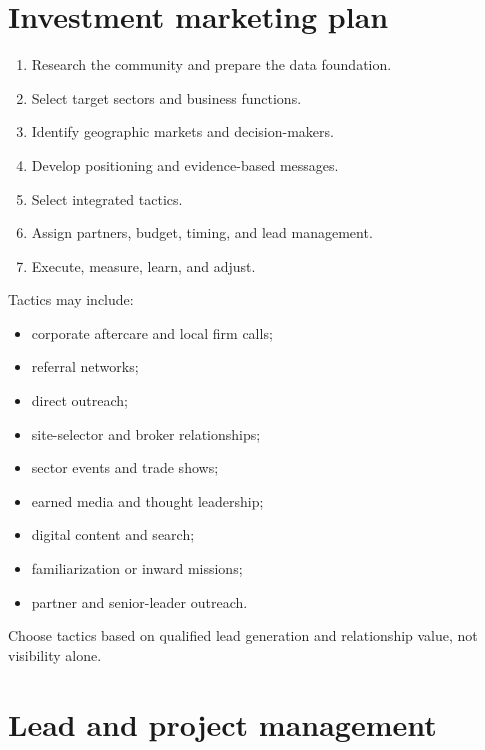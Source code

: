\documentclass[11pt,letterpaper,oneside,openany]{book}
\begin{document}
\section[Investment marketing plan]{Investment marketing plan}
\begin{enumerate}
\item Research the community and prepare the data foundation.
\item Select target sectors and business functions.
\item Identify geographic markets and decision-makers.
\item Develop positioning and evidence-based messages.
\item Select integrated tactics.
\item Assign partners, budget, timing, and lead management.
\item Execute, measure, learn, and adjust.
\end{enumerate}


Tactics may include:


\begin{itemize}
\item corporate aftercare and local firm calls;
\item referral networks;
\item direct outreach;
\item site-selector and broker relationships;
\item sector events and trade shows;
\item earned media and thought leadership;
\item digital content and search;
\item familiarization or inward missions;
\item partner and senior-leader outreach.
\end{itemize}


Choose tactics based on qualified lead generation and relationship value, not visibility alone.


\section[Lead and project management]{Lead and project management}
\end{document}
